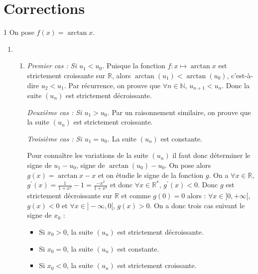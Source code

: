 \newpage
\section{Corrections}

\begin{correction}{1}
On pose $f(x)=\arctan x$.

\begin{enumerate}
\item~
    \begin{enumerate}
        \item
        \textit{Premier cas : Si $u_{1}<u_{0}$.}
        Puisque la fonction $f:x\mapsto \arctan x$ est strictement croissante sur $\mathbb{R}$, alors $\arctan(u_{1})<\arctan(u_{0})$, c'est-à-dire $u_{2}<u_{1}$.
        Par récurrence, on prouve que $\forall n\in\mathbb{N}$, $u_{n+1}<u_{n}$. Donc la suite $(u_{n})$ est strictement décroissante.

        \textit{Deuxième cas : Si $u_{1}>u_{0}$.}
        Par un raisonnement similaire, on prouve que la suite $(u_{n})$ est strictement croissante.

        \textit{Troisième cas : Si $u_{1}=u_{0}$.}
        La suite $(u_{n})$ est constante.

        Pour connaître les variations de la suite $(u_{n})$ il faut donc déterminer le signe de $u_{1}-u_{0}$, signe de $\arctan(u_{0})-u_{0}$.
        On pose alors $g(x)=\arctan x - x$ et on étudie le signe de la fonction $g$.
        On a $\forall x\in\mathbb{R}$, $g^{\prime}(x)=\frac{1}{1+x^{2}} - 1 = \frac{-x^{2}}{1+x^{2}}$ et donc $\forall x\in\mathbb{R}^{*}$, $g^{\prime}(x)<0$.
        Donc $g$ est strictement décroissante sur $\mathbb{R}$ et comme $g(0)=0$ alors :
        $\forall x\in]0,+\infty[$, $g(x)<0$ et $\forall x\in]-\infty,0[$, $g(x)>0$.
        On a donc trois cas suivant le signe de $x_{0}$ :
        \begin{itemize}
            \item Si $x_{0}>0$, la suite $(u_{n})$ est strictement décroissante.
            \item Si $x_{0}=0$, la suite $(u_{n})$ est constante.
            \item Si $x_{0}<0$, la suite $(u_{n})$ est strictement croissante.
        \end{itemize}


\end{enumerate}
\end{enumerate}
\end{correction}
